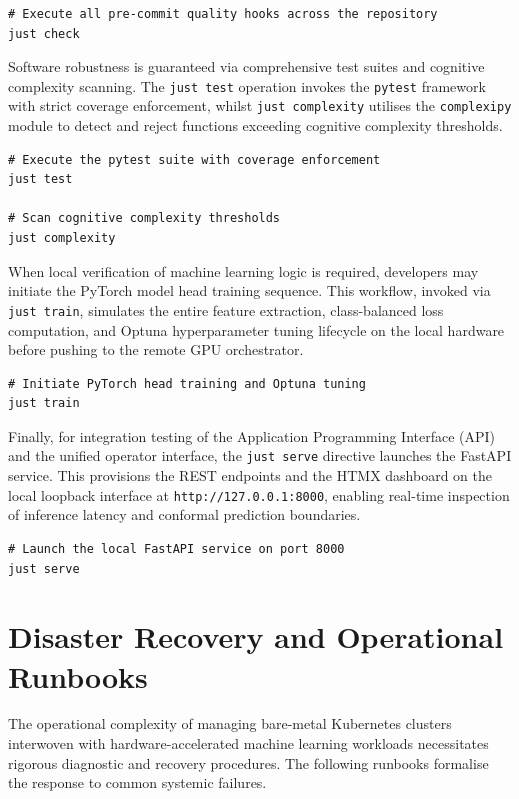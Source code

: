 \begin{verbatim}
# Execute all pre-commit quality hooks across the repository
just check
\end{verbatim}

Software robustness is guaranteed via comprehensive test suites and cognitive complexity scanning. The \texttt{just test} operation invokes the \texttt{pytest} framework with strict coverage enforcement, whilst \texttt{just complexity} utilises the \texttt{complexipy} module to detect and reject functions exceeding cognitive complexity thresholds.

\begin{verbatim}
# Execute the pytest suite with coverage enforcement
just test

# Scan cognitive complexity thresholds
just complexity
\end{verbatim}

When local verification of machine learning logic is required, developers may initiate the PyTorch model head training sequence. This workflow, invoked via \texttt{just train}, simulates the entire feature extraction, class-balanced loss computation, and Optuna hyperparameter tuning lifecycle on the local hardware before pushing to the remote GPU orchestrator.

\begin{verbatim}
# Initiate PyTorch head training and Optuna tuning
just train
\end{verbatim}

Finally, for integration testing of the Application Programming Interface (API) and the unified operator interface, the \texttt{just serve} directive launches the FastAPI service. This provisions the REST endpoints and the HTMX dashboard on the local loopback interface at \texttt{http://127.0.0.1:8000}, enabling real-time inspection of inference latency and conformal prediction boundaries.

\begin{verbatim}
# Launch the local FastAPI service on port 8000
just serve
\end{verbatim}

\section{Disaster Recovery and Operational Runbooks}
\label{sec:cluster_ops_and_rollback}



The operational complexity of managing bare-metal Kubernetes clusters interwoven with hardware-accelerated machine learning workloads necessitates rigorous diagnostic and recovery procedures. The following runbooks formalise the response to common systemic failures.

